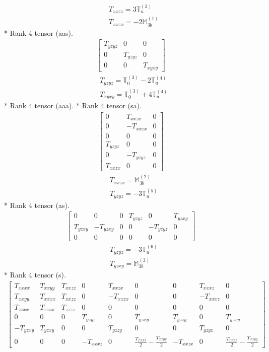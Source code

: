 \documentclass[fleqn,8pt,landscape]{jsarticle}
\begin{document}
\begin{align*}
& T_{xxzz} = 3 \mathbb{T}_{u}^{(3)} \\
& T_{xxzx} = - 2 \mathbb{M}_{3b}^{(1)}
\end{align*}
* Rank 4 tensor (aas).
\begin{align*}
\begin{bmatrix} T_{yzyz} & 0 & 0 \\ 0 & T_{yzyz} & 0 \\ 0 & 0 & T_{xyxy} \end{bmatrix}
\end{align*}
\begin{align*}
& T_{yzyz} = \mathbb{T}_{0}^{(3)} - 2 \mathbb{T}_{u}^{(4)} \\
& T_{xyxy} = \mathbb{T}_{0}^{(3)} + 4 \mathbb{T}_{u}^{(4)}
\end{align*}
* Rank 4 tensor (aaa).
* Rank 4 tensor (sa).
\begin{align*}
\begin{bmatrix} 0 & T_{xxzx} & 0 \\ 0 & - T_{xxzx} & 0 \\ 0 & 0 & 0 \\ T_{yzyz} & 0 & 0 \\ 0 & - T_{yzyz} & 0 \\ T_{xxzx} & 0 & 0 \end{bmatrix}
\end{align*}
\begin{align*}
& T_{xxzx} = \mathbb{M}_{3b}^{(2)} \\
& T_{yzyz} = - 3 \mathbb{T}_{u}^{(5)}
\end{align*}
* Rank 4 tensor (as).
\begin{align*}
\begin{bmatrix} 0 & 0 & 0 & T_{yzyz} & 0 & T_{yzxy} \\ T_{yzxy} & - T_{yzxy} & 0 & 0 & - T_{yzyz} & 0 \\ 0 & 0 & 0 & 0 & 0 & 0 \end{bmatrix}
\end{align*}
\begin{align*}
& T_{yzyz} = - 3 \mathbb{T}_{u}^{(6)} \\
& T_{yzxy} = \mathbb{M}_{3b}^{(3)}
\end{align*}
* Rank 4 tensor (s).
\begin{align*}
\begin{bmatrix} T_{xxxx} & T_{xxyy} & T_{xxzz} & 0 & T_{xxzx} & 0 & 0 & T_{xxxz} & 0 \\ T_{xxyy} & T_{xxxx} & T_{xxzz} & 0 & - T_{xxzx} & 0 & 0 & - T_{xxxz} & 0 \\ T_{zzxx} & T_{zzxx} & T_{zzzz} & 0 & 0 & 0 & 0 & 0 & 0 \\ 0 & 0 & 0 & T_{yzyz} & 0 & T_{yzxy} & T_{yzzy} & 0 & T_{yzxy} \\ - T_{yzxy} & T_{yzxy} & 0 & 0 & T_{yzzy} & 0 & 0 & T_{yzyz} & 0 \\ 0 & 0 & 0 & - T_{xxxz} & 0 & \frac{T_{xxxx}}{2} - \frac{T_{xxyy}}{2} & - T_{xxzx} & 0 & \frac{T_{xxxx}}{2} - \frac{T_{xxyy}}{2} \end{bmatrix}
\end{align*}
\end{document}
